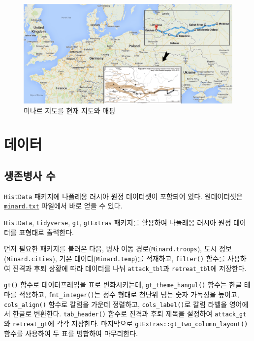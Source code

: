 \documentclass[
  letterpaper,
  chapter,a4paper,showtrims,openright,hidelinks]{oblivoir}
\begin{document}
\begin{figure}

{\centering \includegraphics{images/minard-actual-map.png}

}

\caption{미나르 지도를 현재 지도와 매핑}

\end{figure}

\hypertarget{uxb370uxc774uxd130}{%
\section{데이터}\label{uxb370uxc774uxd130}}

\hypertarget{uxc0dduxc874uxbcd1uxc0ac-uxc218}{%
\subsection{생존병사 수}\label{uxc0dduxc874uxbcd1uxc0ac-uxc218}}

\texttt{HistData} 패키지에 나폴레옹 러시아 원정 데이터셋이 포함되어
있다. 원데이터셋은
\href{https://www.cs.uic.edu/~wilkinson/TheGrammarOfGraphics/minard.txt}{\texttt{minard.txt}}
파일에서 바로 얻을 수 있다.

\texttt{HistData}, \texttt{tidyverse}, \texttt{gt}, \texttt{gtExtras}
패키지를 활용하여 나폴레옹 러시아 원정 데이터를 표형태로 출력한다.

먼저 필요한 패키지를 불러온 다음, 병사 이동
경로(\texttt{Minard.troops}), 도시 정보(\texttt{Minard.cities}), 기온
데이터(\texttt{Minard.temp})를 적재하고, \texttt{filter()} 함수를
사용하여 진격과 후퇴 상황에 따라 데이터를 나눠 \texttt{attack\_tbl}과
\texttt{retreat\_tbl}에 저장한다.

\texttt{gt()} 함수로 데이터프레임을 표로 변화시키는데,
\texttt{gt\_theme\_hangul()} 함수는 한글 테마를 적용하고,
\texttt{fmt\_integer()}는 정수 형태로 천단위 넘는 숫자 가독성을 높이고,
\texttt{cols\_align()} 함수로 칼럼을 가운데 정렬하고,
\texttt{cols\_label()}로 칼럼 라벨을 영어에서 한글로 변환한다.
\texttt{tab\_header()} 함수로 진격과 후퇴 제목을 설정하여
\texttt{attack\_gt}와 \texttt{retreat\_gt}에 각각 저장한다. 마지막으로
\texttt{gtExtras::gt\_two\_column\_layout()} 함수를 사용하여 두 표를
병합하여 마무리한다.
\end{document}
